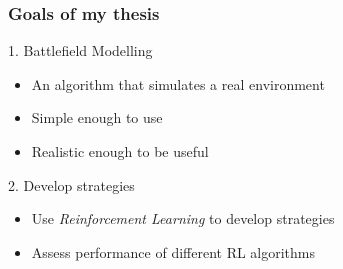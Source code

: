 \documentclass{beamer}
\begin{document}
\begin{frame}
\frametitle{Goals of my thesis}
\begin{block}{1. Battlefield Modelling}
\begin{itemize}
    \item An algorithm that simulates a real environment
    \item Simple enough to use
    \item Realistic enough to be useful
\end{itemize}
\end{block}
\pause
\begin{block}{2. Develop strategies}
\begin{itemize}
    \item Use \emph{Reinforcement Learning} to develop strategies
    \item Assess performance of different RL algorithms
\end{itemize}
\end{block}
\end{frame}
\end{document}
